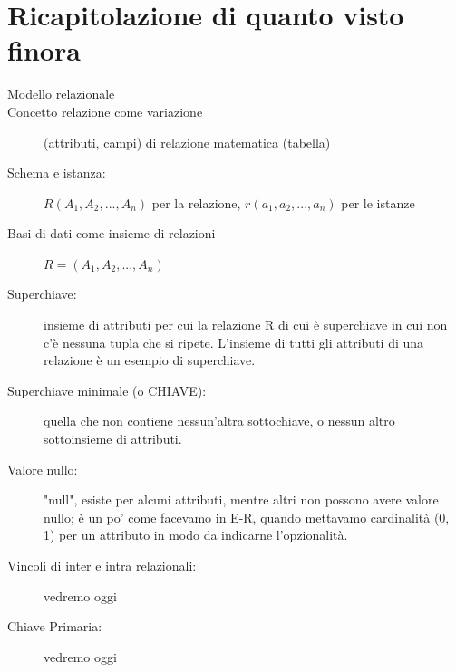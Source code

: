 \section{Ricapitolazione di quanto visto finora}
\begin{description}
    \item[Modello relazionale]
    \item[Concetto relazione come variazione] (attributi, campi) di relazione matematica (tabella)
    \item[Schema e istanza:] $R(A_1, A_2, ..., A_n)$ per la relazione, $r(a_1, a_2, ..., a_n)$ per le istanze
    \item[Basi di dati come insieme di relazioni] $R = {(A_1, A_2, ..., A_n)}$
    \item[Superchiave:] insieme di attributi per cui la relazione R di cui è superchiave in cui non c'è nessuna tupla che si ripete. L'insieme di tutti gli attributi di una relazione è un esempio di superchiave.
    \item[Superchiave minimale (o CHIAVE):] quella che non contiene nessun'altra sottochiave, o nessun altro sottoinsieme di attributi.
    \item[Valore nullo:] "null", esiste per alcuni attributi, mentre altri non possono avere valore nullo; è un po' come facevamo in E-R, quando mettavamo cardinalità (0, 1) per un attributo in modo da indicarne l'opzionalità.
    \item[Vincoli di inter e intra relazionali:] vedremo oggi
    \item[Chiave Primaria:] vedremo oggi
\end{description}

